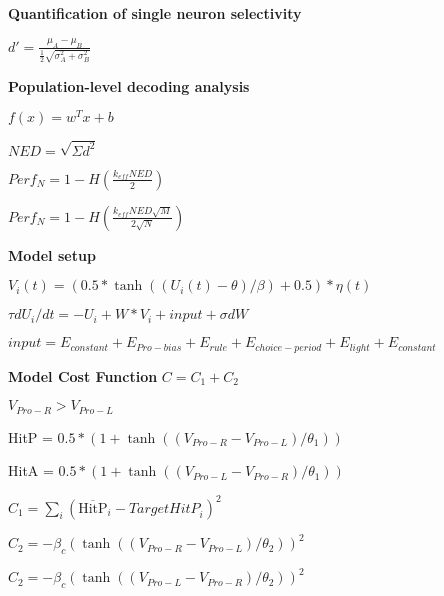 \documentclass[a4paper, 11pt]{article}
\begin{document}
\textbf{Quantification of single neuron selectivity}

$d' = \frac{\mu_A-\mu_B}{\frac{1}{2}\sqrt{\sigma_A^2 + \sigma_B^2}}$

\textbf{Population-level decoding analysis}

$f(x) = w^Tx + b$

$NED = \sqrt{\Sigma d^2}$

$Perf_N = 1-H\left(\frac{k_{eff}NED}{2} \right)$

$Perf_N = 1-H\left(\frac{k_{eff}NED\sqrt{M}}{2\sqrt{N}} \right)$

\textbf{Model setup}

$V_i(t) = \left(0.5*\tanh\left(\left(U_i(t) - \theta\right)/\beta\right) + 0.5\right)*\eta(t)$

$\tau dU_i/dt = -U_i + W*V_i + \textit{input} + \sigma dW$

$input = E_{constant} + E_{Pro-bias} + E_{rule} + E_{choice-period} + E_{light} + E_{constant}$

\textbf{Model Cost Function}
$C=C_1 + C_2$

$V_{Pro-R} > V_{Pro-L}$

HitP = $0.5*\left(1+\tanh\left(\left(V_{Pro-R}-V_{Pro-L}\right)/\theta_1\right)\right)$

HitA = $0.5*\left(1+\tanh\left(\left(V_{Pro-L}-V_{Pro-R}\right)/\theta_1\right)\right)$

$C_1 = \sum\limits_i\left(\overline{\text{HitP}}_i - \textit{TargetHitP}_i    \right)^2$

$C_2 = -\beta_c\left(\tanh\left(\left( V_{Pro-R} - V_{Pro-L} \right)/\theta_2\right)\right)^2$

$C_2 = -\beta_c\left(\tanh\left(\left( V_{Pro-L} - V_{Pro-R} \right)/\theta_2\right)\right)^2$
\end{document}
